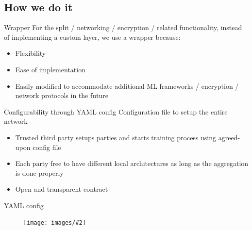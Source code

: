 \documentclass[xcolor=dvipsnames]{beamer}
\newcommand{\img}[2] {
  \begin{figure}
    \centering
    \texttt{[image: images/\#2]}
  \end{figure}
}
\begin{document}
\subsection{How we do it}
\begin{frame}{Wrapper}
    For the split / networking / encryption / related functionality, instead of implementing a custom layer, we use a wrapper because:
    \begin{itemize}
        \item Flexibility
        \item Ease of implementation
        \item Easily modified to accommodate additional ML frameworks / encryption / network protocols in the future
    \end{itemize}
\end{frame}

\begin{frame}{Configurability through YAML config}
    Configuration file to setup the entire network
    \begin{itemize}
        \item Trusted third party setups parties and starts training process using agreed-upon config file
        \item Each party free to have different local architectures as long as the aggregation is done properly
        \item Open and transparent contract 
    \end{itemize}
\end{frame}

\begin{frame}{YAML config}
    \img{0.85}{yaml2.png}
\end{frame}
\end{document}

